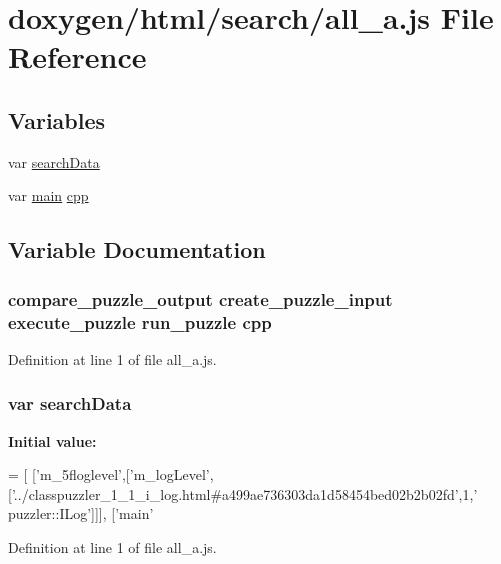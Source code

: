 \hypertarget{a00055}{}\section{doxygen/html/search/all\+\_\+a.js File Reference}
\label{a00055}
\subsection*{Variables}
\begin{DoxyCompactItemize}
\item 
var \hyperlink{a00055_ad01a7523f103d6242ef9b0451861231e}{search\+Data}
\item 
var \hyperlink{a00144_a0ddf1224851353fc92bfbff6f499fa97}{main} \hyperlink{a00055_ae5c6c9d017d51c77bccab71140b713c2}{cpp}
\end{DoxyCompactItemize}


\subsection{Variable Documentation}
\hypertarget{a00055_ae5c6c9d017d51c77bccab71140b713c2}{}
\subsubsection[{cpp}]{ compare\+\_\+puzzle\+\_\+output create\+\_\+puzzle\+\_\+input execute\+\_\+puzzle run\+\_\+puzzle cpp}\label{a00055_ae5c6c9d017d51c77bccab71140b713c2}


Definition at line 1 of file all\+\_\+a.\+js.

\hypertarget{a00055_ad01a7523f103d6242ef9b0451861231e}{}
\subsubsection[{search\+Data}]{\setlength{\rightskip}{0pt plus 5cm}var search\+Data}\label{a00055_ad01a7523f103d6242ef9b0451861231e}
{\bfseries Initial value\+:}
\begin{DoxyCode}
=
[
  [\textcolor{stringliteral}{'m\_5floglevel'},[\textcolor{stringliteral}{'m\_logLevel'},[\textcolor{stringliteral}{'../classpuzzler\_1\_1\_i\_log.html#a499ae736303da1d58454bed02b2b02fd'},1,\textcolor{stringliteral}{'
      puzzler::ILog'}]]],
  [\textcolor{stringliteral}{'main'}
\end{DoxyCode}


Definition at line 1 of file all\+\_\+a.\+js.

